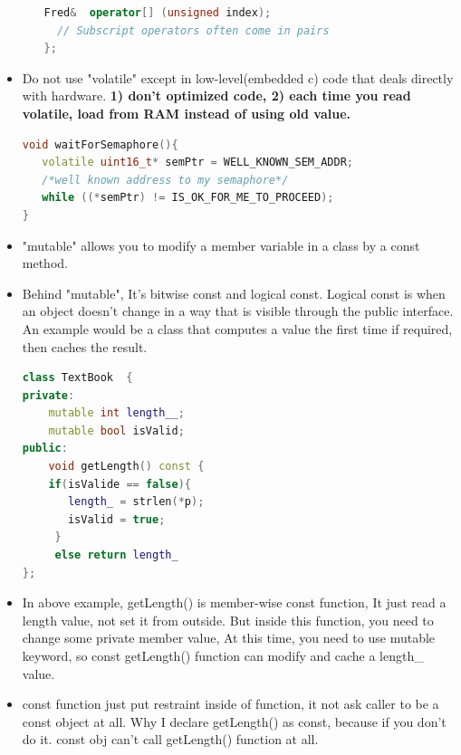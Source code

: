 \documentclass[a4paper,12pt,twoside]{book}
\begin{document}
\begin{itemize}
\begin{enumerate}
\begin{lstlisting}[frame=single, language=c++, mathescape=true]
  Fred&  operator[] (unsigned index);
  // Subscript operators often come in pairs
};
\end{lstlisting}


\end{enumerate}

\item Do not use "volatile" except in low-level(embedded c) code that deals directly with hardware. \textbf{1) don't optimized code, 2) each time you read volatile, load from RAM instead of using old value.}
\begin{lstlisting}[frame=single, language=c++]
void waitForSemaphore(){
   volatile uint16_t* semPtr = WELL_KNOWN_SEM_ADDR;
   /*well known address to my semaphore*/
   while ((*semPtr) != IS_OK_FOR_ME_TO_PROCEED);
}
\end{lstlisting}

\item "mutable" allows you to modify a member variable in a class by a const method.

\item Behind "mutable", It's bitwise const and logical const. Logical const is when an object doesn't change in a way that is visible through the public interface. An example would be a class that computes a value the first time if required, then caches the result.
\begin{lstlisting}[frame=single, language=c++]
class TextBook  {
private:
    mutable int length__;
    mutable bool isValid;
public:
    void getLength() const {
    if(isValide == false){
       length_ = strlen(*p);
       isValid = true; 
     }
     else return length_
};
\end{lstlisting}

\item In above example, getLength() is member-wise const function, It just read a length value, not set it from outside. But inside this function, you need to change some private member value, At this time, you need to use mutable keyword, so const getLength() function can modify and cache a length\_ value.

\item const function just put restraint inside of function, it not ask caller to be a const object at all. Why I declare getLength() as const, because if you don't do it. const obj can't call getLength() function at all. 

\end{itemize}
\end{document}
